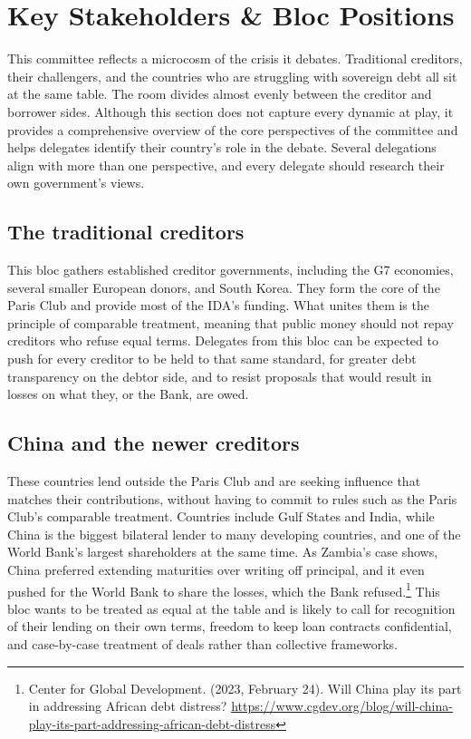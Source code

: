 \section{Key Stakeholders \& Bloc Positions}

This committee reflects a microcosm of the crisis it debates. Traditional creditors, their challengers, and the countries who are struggling with sovereign debt all sit at the same table. The room divides almost evenly between the creditor and borrower sides. Although this section does not capture every dynamic at play, it provides a comprehensive overview of the core perspectives of the committee and helps delegates identify their country’s role in the debate. Several delegations align with more than one perspective, and every delegate should research their own government’s views.

\subsection{The traditional creditors}

This bloc gathers established creditor governments, including the G7 economies, several smaller European donors, and South Korea. They form the core of the Paris Club and provide most of the IDA’s funding. What unites them is the principle of comparable treatment, meaning that public money should not repay creditors who refuse equal terms. Delegates from this bloc can be expected to push for every creditor to be held to that same standard, for greater debt transparency on the debtor side, and to resist proposals that would result in losses on what they, or the Bank, are owed.

\subsection{China and the newer creditors}

These countries lend outside the Paris Club and are seeking influence that matches their contributions, without having to commit to rules such as the Paris Club’s comparable treatment. Countries include Gulf States and India, while China is the biggest bilateral lender to many developing countries, and one of the World Bank’s largest shareholders at the same time. As Zambia’s case shows, China preferred extending maturities over writing off principal, and it even pushed for the World Bank to share the losses, which the Bank refused.\footnote{Center for Global Development. (2023, February 24). Will China play its part in addressing African debt distress? \url{https://www.cgdev.org/blog/will-china-play-its-part-addressing-african-debt-distress}} This bloc wants to be treated as equal at the table and is likely to call for recognition of their lending on their own terms, freedom to keep loan contracts confidential, and case-by-case treatment of deals rather than collective frameworks.

